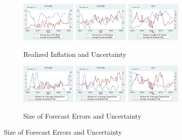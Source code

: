 \documentclass[12pt]{article}
\begin{document}
	
	\begin{figure}[ht]
		\centering
		\begin{subfigure}[b]{\textwidth}
			\centering
			\caption{Realized Inflation and Uncertainty}
			\label{InfVar}
			\includegraphics[width=0.3\textwidth]{figures/Inf1yf_CPICore_varSPFCPIQ.png}
			\includegraphics[width=0.3\textwidth]{figures/Inf1yf_PCECore_varSPFPCEQ.png}
			\includegraphics[width=0.3\textwidth]{figures/Inf1yf_CPIAU_varSCEM.png}
		\end{subfigure}
	    \vspace{1em}
		\vfill
		\begin{subfigure}[b]{\textwidth}
			\centering
			\caption{Size of Forecast Errors and Uncertainty}
			\label{FEVar}
			\includegraphics[width=0.3\textwidth]{figures/SPFCPI_abFE_varSPFCPIQ.png}
			\includegraphics[width=0.3\textwidth]{figures/SPFPCE_abFE_varSPFPCEQ.png}
			\includegraphics[width=0.3\textwidth]{figures/SCE_abFE_varSCEM.png}

\end{subfigure}
\end{figure}
\end{document}
